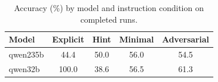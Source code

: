 \begin{table}[t]
\centering
\small
\begin{tabular}{lcccc}
\toprule
Model & Explicit & Hint & Minimal & Adversarial \\
\midrule
qwen235b & 44.4 & 50.0 & 56.0 & 54.5 \\
qwen32b & 100.0 & 38.6 & 56.5 & 61.3 \\
\bottomrule
\end{tabular}
\caption{Accuracy (\%) by model and instruction condition on completed runs.}
\label{tab:results}
\end{table}
